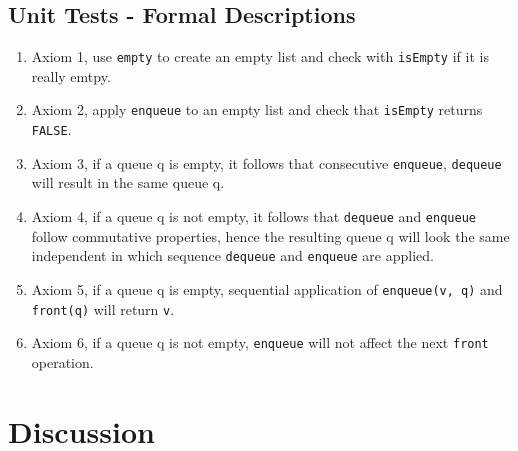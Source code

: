 \documentclass[a4paper,11pt,twoside]{article}
\begin{document}
\subsection{Unit Tests - Formal Descriptions}
\begin{enumerate}
  \item Axiom 1, use \texttt{empty} to create an empty list and check
    with \texttt{isEmpty} if it is really emtpy. 
    \item Axiom 2, apply \texttt{enqueue} to an empty list and check
      that \texttt{isEmpty} returns \texttt{FALSE}.
      \item Axiom 3, if a queue q is empty, it follows that 
        consecutive \texttt{enqueue}, \texttt{dequeue} will result in
        the same queue q. 
        \item Axiom 4, if a queue q is not empty, it follows that
          \texttt{dequeue} and \texttt{enqueue} follow commutative
          properties, hence the resulting queue q will look the same
          independent in which sequence \texttt{dequeue} and 
          \texttt{enqueue} are applied.
          \item Axiom 5, if a queue q is empty, sequential
            application of \texttt{enqueue(v, q)} and
            \texttt{front(q)} will return \texttt{v}.
            \item Axiom 6, if a queue q is not empty,
              \texttt{enqueue} will not affect the next \texttt{front}
              operation. 
\end{enumerate}

\section{Discussion}
\end{document}
